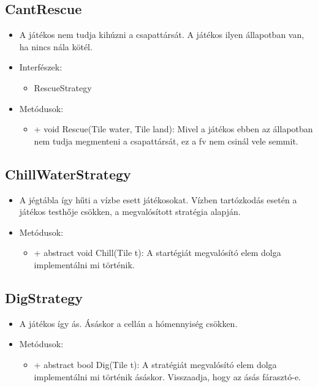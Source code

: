 \subsection{CantRescue}
\begin{itemize}
	\item A játékos nem tudja kihúzni a csapattársát. A játékos ilyen állapotban van, ha nincs nála kötél.
	\item Interfészek:
	\begin{itemize}
		\item RescueStrategy
	\end{itemize}
	\item Metódusok:
	\begin{itemize}
		\item + void Rescue(Tile water, Tile land): Mivel a játékos ebben az állapotban nem tudja megmenteni a csapattársát, ez a fv nem csinál vele semmit. 
	\end{itemize}
\end{itemize}

\subsection{ChillWaterStrategy}
\begin{itemize}
	\item A jégtábla így hűti a vízbe esett játékosokat. Vízben tartózkodás esetén a játékos testhője csökken, a megvalósított stratégia alapján.
	\item Metódusok:
	\begin{itemize}
		\item + abstract void Chill(Tile t): A startégiát megvalósító elem dolga implementálni mi történik.
	\end{itemize}
\end{itemize}

\subsection{DigStrategy}
\begin{itemize}
	\item A játékos így ás.	Ásáskor a cellán a hómennyiség csökken.
	\item Metódusok:
	\begin{itemize}
		\item + abstract bool Dig(Tile t): A stratégiát megvalósító elem dolga implementálni mi történik ásáskor. Visszaadja, hogy az ásás fárasztó-e.
	\end{itemize}
\end{itemize}

